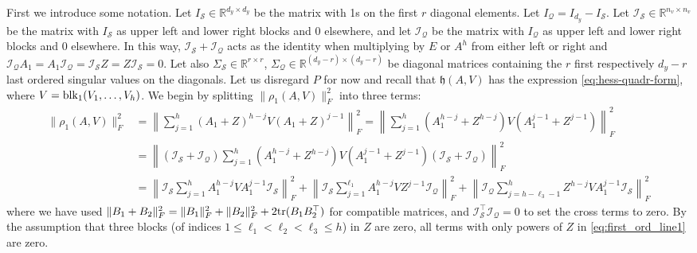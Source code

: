 \documentclass{article}
\makeatletter
\renewenvironment{proof}[1][\proofname]{
  \par\pushQED{\qed}\normalfont
  \topsep6\p@\@plus6\p@\relax
  \trivlist\item[\hskip\labelsep\bfseries#1\@addpunct{.}]
  \ignorespaces
}{
  \popQED\endtrivlist\@endpefalse
}
\def\tr{{\rm tr}}
\def\block{{\rm blk}}
\newcommand{\1}{\mathds{1}}
\makeatother
\begin{document}
\begin{proof}
First we introduce some notation. Let $I_\mathcal{S}\in\mathbb{R}^{d_y\times d_y }$ be the matrix with 1s on the first $r$ diagonal elements. Let $I_\mathcal{Q}=I_{d_y}-I_\mathcal{S}$. Let $\mathcal{I}_\mathcal{S}\in\mathbb{R}^{n_v \times n_v }$ be the matrix with $I_\mathcal{S}$ as upper left and lower right blocks and $0$ elsewhere, and let $\mathcal{I}_\mathcal{Q}$ be the matrix with $I_\mathcal{Q}$ as upper left and lower right blocks and $0$ elsewhere. In this way, $\mathcal{I}_\mathcal{S}+\mathcal{I}_\mathcal{Q}$ acts as the identity when multiplying by $E$ or $A^h$ from either left or right and $\mathcal{I}_\mathcal{Q} A_1= A_1 \mathcal{I}_\mathcal{Q} =\mathcal{I}_\mathcal{S} Z= Z \mathcal{I}_\mathcal{S} = 0$. Let also $\Sigma_\mathcal{S}\in \mathbb{R}^{r \times r}$, $\Sigma_\mathcal{Q}\in \mathbb{R}^{(d_y-r) \times (d_y-r)}$ be diagonal matrices containing the $r$ first respectively $d_y-r$ last ordered singular values on the diagonals.
    Let us disregard $P$ for now and recall that $\mathfrak{h}(A,V) $ has the expression \eqref{eq:hess-quadr-form}, where $ V =\block_1( V_1, \ldots, V_h )$. We begin by splitting $\lVert \rho_1(A,V)  \rVert_F^2$ into three terms:
    \begin{align}
    	\lVert \rho_1(A,V)  \rVert_F^2 & = \left\lVert \sum_{j=1}^{h} (A_1 + Z)^{h-j}V(A_1 + Z)^{j-1} \right\rVert_F^2 = \left \lVert \sum_{j=1}^{h} (A_1^{h-j} + Z^{h-j})V(A_1^{j-1} + Z^{j-1}) \right \rVert_F^2 \label{eq:first_ord_line1} \\
    	& = \left \lVert (\mathcal{I}_\mathcal{S}+\mathcal{I}_\mathcal{Q}) \sum_{j=1}^{h} (A_1^{h-j} + Z^{h-j})V(A_1^{j-1} + Z^{j-1}) (\mathcal{I}_\mathcal{S}+\mathcal{I}_\mathcal{Q}) \right \rVert_F^2 \\
    	& = \left \lVert \mathcal{I}_\mathcal{S} \sum_{j=1}^{h} A_1^{h-j} V A_1^{j-1} \mathcal{I}_\mathcal{S} \right \rVert_F^2 + \left \lVert \mathcal{I}_\mathcal{S} \sum_{j=1}^{\ell_1} A_1^{h-j} V Z^{j-1} \mathcal{I}_\mathcal{Q} \right \rVert_F^2 + \left \lVert \mathcal{I}_\mathcal{Q} \sum_{j=h-\ell_3-1}^{h} Z^{h-j} V A_1^{j-1} \mathcal{I}_\mathcal{S} \right \rVert_F^2 \label{eq:first_ord_terms}
    \end{align}
    where we have used $\lVert B_1 + B_2 \rVert_F^2 = \lVert B_1 \rVert_F^2 + \lVert B_2 \rVert_F^2 + 2\tr{(B_1B_2^\top)}$ for compatible matrices, and $\mathcal{I}_\mathcal{S}^\top\mathcal{I}_\mathcal{Q} = 0$ to set the cross terms to zero. By the assumption that three blocks (of indices $ 1\leq \ell_1<\ell_2<\ell_3 \leq h $) in $Z$ are zero, all terms with only powers of $Z$ in \eqref{eq:first_ord_line1} are zero. 


\end{proof}
\end{document}

